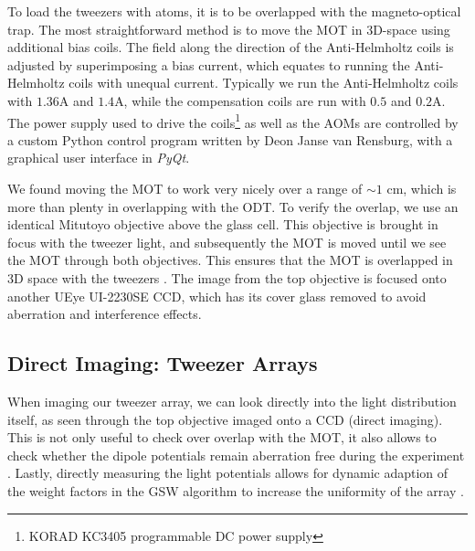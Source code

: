 To load the tweezers with atoms, it is to be overlapped with the magneto-optical trap.
The most straightforward method is to move the MOT in 3D-space using additional bias coils.
The field along the direction of the Anti-Helmholtz coils is adjusted by superimposing a bias current, which equates to running the Anti-Helmholtz coils with unequal current. 
Typically we run the Anti-Helmholtz coils with $1.36$A and $1.4$A, while the compensation coils are run with $0.5$ and $0.2$A.
The power supply used to drive the coils\footnote{KORAD KC3405 programmable DC power supply} as well as the \ac{AOM}s are controlled by a custom Python control program written by Deon Janse van Rensburg, with a graphical user interface in \textit{PyQt}.

We found moving the MOT to work very nicely over a range of $\sim 1$ cm, which is more than plenty in overlapping with the \ac{ODT}.
To verify the overlap, we use an identical Mitutoyo objective above the glass cell.
This objective is brought in focus with the tweezer light, and subsequently the MOT is moved until we see the MOT through both objectives. 
This ensures that the MOT is overlapped in 3D space with the tweezers .
The image from the top objective is focused onto another UEye UI-2230SE \ac{CCD}, which has its cover glass removed to avoid aberration and interference effects. 




\subsection{Direct Imaging: Tweezer Arrays}\label{sec:TweezerImaging}

When imaging our tweezer array, we can look directly into the light distribution itself, as seen through the top objective imaged onto a CCD (direct imaging).
This is not only useful to check over overlap with the MOT, it also allows to check whether the dipole potentials remain aberration free during the experiment \cite{Baumgaertner2017}.
Lastly, directly measuring the light potentials allows for dynamic adaption of the weight factors in the \ac{GSW} algorithm to increase the uniformity of the array \cite{Nogrette2014}.

